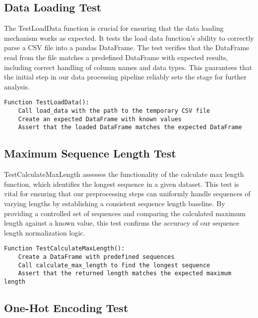\documentclass[12pt]{article}
\begin{document}
\subsection{Data Loading Test}

The TestLoadData function is crucial for ensuring that the data loading mechanism works as expected. It tests the load data function's ability to correctly parse a CSV file into a pandas DataFrame. The test verifies that the DataFrame read from the file matches a predefined DataFrame with expected results, including correct handling of column names and data types. This guarantees that the initial step in our data processing pipeline reliably sets the stage for further analysis.

\begin{lstlisting}[caption=Pseudocode: Test for Data Loading Function]
Function TestLoadData():
    Call load_data with the path to the temporary CSV file
    Create an expected DataFrame with known values
    Assert that the loaded DataFrame matches the expected DataFrame
\end{lstlisting}

\subsection{Maximum Sequence Length Test}

TestCalculateMaxLength assesses the functionality of the calculate max length function, which identifies the longest sequence in a given dataset. This test is vital for ensuring that our preprocessing steps can uniformly handle sequences of varying lengths by establishing a consistent sequence length baseline. By providing a controlled set of sequences and comparing the calculated maximum length against a known value, this test confirms the accuracy of our sequence length normalization logic.

\begin{lstlisting}[caption=Pseudocode: Test for Maximum Sequence Length Calculation]
Function TestCalculateMaxLength():
    Create a DataFrame with predefined sequences
    Call calculate_max_length to find the longest sequence
    Assert that the returned length matches the expected maximum length
\end{lstlisting}

\subsection{One-Hot Encoding Test}
\end{document}

